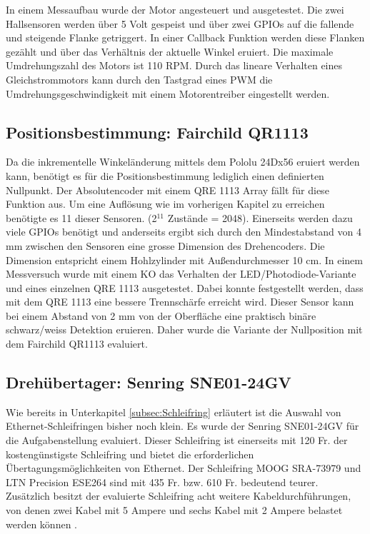 In einem Messaufbau wurde der Motor angesteuert und ausgetestet. Die zwei Hallsensoren werden über 5 Volt gespeist und über zwei GPIOs auf die fallende und steigende Flanke getriggert. In einer Callback Funktion werden diese Flanken gezählt und über das Verhältnis der aktuelle Winkel eruiert. Die maximale Umdrehungszahl des Motors ist 110 RPM. Durch das lineare Verhalten eines Gleichstrommotors kann durch den Tastgrad eines \ac{PWM} die Umdrehungsgeschwindigkeit mit einem Motorentreiber eingestellt werden. 

\subsection{Positionsbestimmung: Fairchild QR1113}
\label{subsec:QR1113}
Da die inkrementelle Winkeländerung mittels dem Pololu 24Dx56 eruiert werden kann, benötigt es für die Positionsbestimmung lediglich einen definierten Nullpunkt. Der Absolutencoder mit einem QRE 1113 Array fällt für diese Funktion aus. Um eine Auflösung wie im vorherigen Kapitel zu erreichen benötigte es 11 dieser Sensoren. (2$^{11}$ Zustände = 2048). Einerseits werden dazu viele GPIOs benötigt und anderseits ergibt sich durch den Mindestabstand von 4 mm zwischen den Sensoren eine grosse Dimension des Drehencoders. Die Dimension entspricht einem Hohlzylinder mit Außendurchmesser 10 cm.
In einem Messversuch wurde mit einem \ac{KO} das Verhalten der LED/Photodiode-Variante und eines einzelnen QRE 1113 ausgetestet. Dabei konnte festgestellt werden, dass mit dem QRE 1113 eine bessere Trennschärfe erreicht wird. Dieser Sensor kann bei einem Abstand von 2 mm von der Oberfläche eine praktisch binäre schwarz/weiss Detektion eruieren. Daher wurde die Variante der Nullposition mit dem Fairchild QR1113 evaluiert.

\subsection{Drehübertager: Senring SNE01-24GV}
\label{subsec:SNE01}
Wie bereits in Unterkapitel \ref{subsec:Schleifring} erläutert ist die Auswahl von Ethernet-Schleifringen bisher noch klein. Es wurde der Senring SNE01-24GV für die Aufgabenstellung evaluiert. Dieser Schleifring ist einerseits mit 120 Fr. der kostengünstigste Schleifring und bietet die erforderlichen Übertagungsmöglichkeiten von Ethernet. Der Schleifring MOOG SRA-73979 und LTN Precision ESE264 sind mit 435 Fr. bzw. 610 Fr. bedeutend teurer. Zusätzlich besitzt der evaluierte Schleifring acht weitere Kabeldurchführungen, von denen zwei Kabel mit 5 Ampere und sechs Kabel mit 2 Ampere belastet werden können \cite{senring}.

